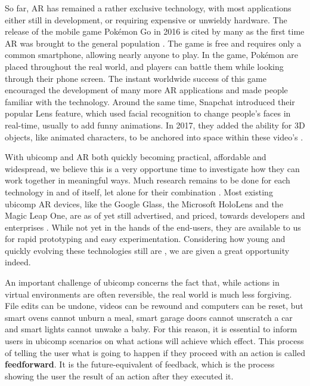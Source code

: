 So far, AR has remained a rather exclusive technology, with most applications either still in development, or requiring expensive or unwieldy hardware. The release of the mobile game Pokémon Go in 2016 is cited by many as the first time AR was brought to the general population \cite{HowPokem83:online}. The game is free and requires only a common smartphone, allowing nearly anyone to play. In the game, Pokémon are placed throughout the real world, and players can battle them while looking through their phone screen. The instant worldwide success of this game encouraged the development of many more AR applications and made people familiar with the technology. Around the same time, Snapchat introduced their popular Lens feature, which used facial recognition to change people's faces in real-time, usually to add funny animations. In 2017, they added the ability for 3D objects, like animated characters, to be anchored into space within these video's \cite{Snapchat36:online}.

With ubicomp and AR both quickly becoming practical, affordable and widespread, we believe this is a very opportune time to investigate how they can work together in meaningful ways. Much research remains to be done for each technology in and of itself, let alone for their combination \cite{liberati2016augmented}. Most existing ubicomp AR devices, like the Google Glass, the Microsoft HoloLens and the Magic Leap One, are as of yet still advertised, and priced, towards developers and enterprises \cite{Wearable31:online,Microsof18:online,MagicLea40:online}. While not yet in the hands of the end-users, they are available to us for rapid prototyping and easy experimentation. Considering how young and quickly evolving these technologies still are \cite{liberati2016augmented}, we are given a great opportunity indeed.

An important challenge of ubicomp concerns the fact that, while actions in virtual environments are often reversible, the real world is much less forgiving. File edits can be undone, videos can be rewound and computers can be reset, but smart ovens cannot unburn a meal, smart garage doors cannot unscratch a car and smart lights cannot unwake a baby. For this reason, it is essential to inform users in ubicomp scenarios on what actions will achieve which effect. This process of telling the user what is going to happen if they proceed with an action is called \textbf{feedforward}. It is the future-equivalent of feedback, which is the process showing the user the result of an action after they executed it.

